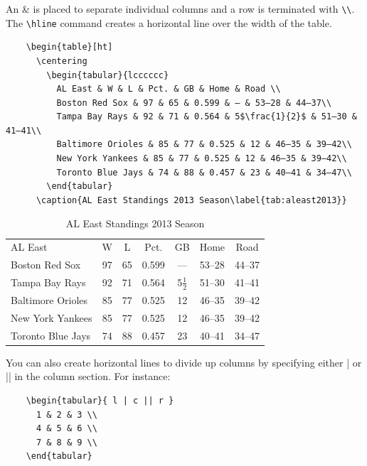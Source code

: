 \documentclass[12pt,a4paper]{article}
\begin{document}
    An \& is placed to separate individual columns and a row is
    terminated with \verb|\\|.  The \verb|\hline| command creates a
    horizontal line over the width of the table.  
    \begin{verbatim}
    \begin{table}[ht]
      \centering
        \begin{tabular}{lcccccc}
          AL East & W & L & Pct. & GB & Home & Road \\
          Boston Red Sox & 97 & 65 & 0.599 & — & 53–28 & 44–37\\
          Tampa Bay Rays & 92 & 71 & 0.564 & 5$\frac{1}{2}$ & 51–30 & 41–41\\
          Baltimore Orioles & 85 & 77 & 0.525 & 12 & 46–35 & 39–42\\
          New York Yankees & 85 & 77 & 0.525 & 12 & 46–35 & 39–42\\
          Toronto Blue Jays & 74 & 88 & 0.457 & 23 & 40–41 & 34–47\\
        \end{tabular}
      \caption{AL East Standings 2013 Season\label{tab:aleast2013}}
    \end{verbatim}
    \begin{table}[ht]
      \centering
        \begin{tabular}{lcccccc}
          AL East & W & L & Pct. & GB & Home & Road \\
          Boston Red Sox & 97 & 65 & 0.599 & — & 53–28 & 44–37\\
          Tampa Bay Rays & 92 & 71 & 0.564 & 5$\frac{1}{2}$ & 51–30 & 41–41\\
          Baltimore Orioles & 85 & 77 & 0.525 & 12 & 46–35 & 39–42\\
          New York Yankees & 85 & 77 & 0.525 & 12 & 46–35 & 39–42\\
          Toronto Blue Jays & 74 & 88 & 0.457 & 23 & 40–41 & 34–47\\
        \end{tabular}
      \caption{AL East Standings 2013 Season\label{tab:aleast2013}}
    \end{table}

    \vspace{.5cm}
    You can also create horizontal lines to divide up columns by specifying
    either | or || in the column section.  For instance:
    \vspace{.5cm}

    \begin{verbatim}
    \begin{tabular}{ l | c || r }
      1 & 2 & 3 \\
      4 & 5 & 6 \\
      7 & 8 & 9 \\
    \end{tabular}
    \end{verbatim}
    \vspace{.5cm}
\end{document}
